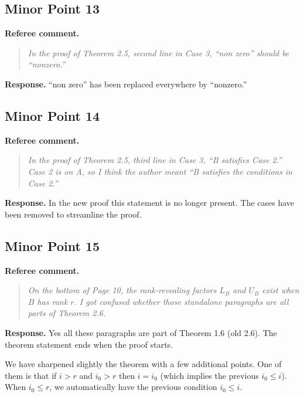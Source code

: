 \documentclass[11pt]{article}
\newenvironment{refereecomment}
{\par\smallskip\noindent\textbf{\color{commentblue}Referee comment.}
\begin{quote}\itshape}
  {
\end{quote}}
\newenvironment{authorresponse}
{\par\smallskip\noindent\textbf{\color{responsegreen}Response.}}
{\par\smallskip}
\begin{document}
\subsection*{Minor Point 13}

\begin{refereecomment}
  In the proof of Theorem 2.5, second line in Case 3, “non zero” should be “nonzero.”
\end{refereecomment}

\begin{authorresponse}
  “non zero” has been replaced everywhere by “nonzero.”
\end{authorresponse}

\subsection*{Minor Point 14}

\begin{refereecomment}
  In the proof of Theorem 2.5, third line in Case 3, “B satisfies Case 2.” Case 2 is on A, so I think the author meant “B satisfies the conditions in Case 2.”
\end{refereecomment}

\begin{authorresponse}
  In the new proof this statement is no longer present. The cases have been removed to streamline the proof.
\end{authorresponse}

\subsection*{Minor Point 15}

\begin{refereecomment}
  On the bottom of Page 10, the rank-revealing factors $L_B$ and $U_B$ exist when $B$ has rank $r$. I got confused whether those standalone paragraphs are all parts of Theorem 2.6.
\end{refereecomment}

\begin{authorresponse}
  Yes all these paragraphs are part of Theorem 1.6 (old 2.6). The theorem statement ends when the proof starts.

  We have sharpened slightly the theorem with a few additional points. One of them is that if $i>r$ and $i_0 > r$ then $i = i_0$ (which implies the previous $i_0 \le i$). When $i_0 \le r$, we automatically have the previous condition $i_0 \le i$.
\end{authorresponse}
\end{document}
